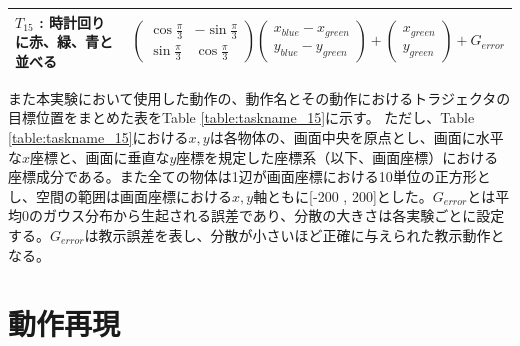 \begin{table}[h]
\begin{tabular}{|l|l|}
    	$T_{15}$ : 時計回りに赤、緑、青と並べる & 
	$
	\begin{pmatrix}
        	\cos \frac{\pi}{3} & -\sin \frac{\pi}{3} \\
        	\sin \frac{\pi}{3} & \cos \frac{\pi}{3}
	\end{pmatrix}
	\begin{pmatrix}
        	x_{blue}-x_{green} \\
        	y_{blue}-y_{green}
	\end{pmatrix}
      	+
	\begin{pmatrix}
        	x_{green} \\
        	y_{green}
	\end{pmatrix}      	
	+G_{error}
    	$
    	\\ \hline
  	\end{tabular}
\end{table}
また本実験において使用した動作の、動作名とその動作におけるトラジェクタの目標位置をまとめた表をTable \ref{table:taskname_15}に示す。
ただし、Table \ref{table:taskname_15}における$x , y$は各物体の、画面中央を原点とし、画面に水平な$x$座標と、画面に垂直な$y$座標を規定した座標系（以下、画面座標）における座標成分である。また全ての物体は1辺が画面座標における10単位の正方形とし、空間の範囲は画面座標における$x,y$軸ともに[-200 , 200]とした。$G_{error}$とは平均0のガウス分布から生起される誤差であり、分散の大きさは各実験ごとに設定する。$G_{error}$は教示誤差を表し、分散が小さいほど正確に与えられた教示動作となる。


\section{動作再現}


